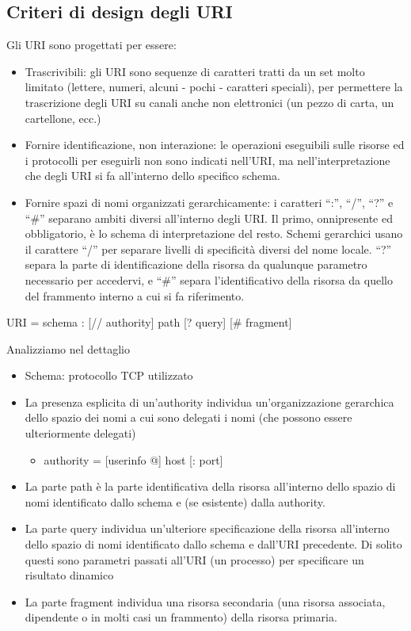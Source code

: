 \documentclass[a4paper,12pt]{article}
\begin{document}
\subsection*{Criteri di design degli URI}
Gli URI sono progettati per essere:
\begin{itemize}
  \item Trascrivibili: gli URI sono sequenze di caratteri tratti da un set molto limitato (lettere, numeri, alcuni - pochi - caratteri speciali), per permettere la trascrizione degli URI su canali anche non elettronici (un pezzo di carta, un cartellone, ecc.)
  \item Fornire identificazione, non interazione: le operazioni eseguibili sulle risorse ed i protocolli per eseguirli non sono indicati nell’URI, ma nell’interpretazione che degli URI si fa all’interno dello specifico schema.
  \item Fornire spazi di nomi organizzati gerarchicamente: i caratteri ``:'', ``/'', ``?'' e ``\#'' separano ambiti diversi all’interno degli URI. Il primo, onnipresente ed obbligatorio, è lo schema di interpretazione del resto. Schemi gerarchici usano il carattere ``/'' per separare livelli di specificità diversi del nome locale. ``?'' separa la parte di identificazione della risorsa da qualunque parametro necessario per accedervi, e ``\#'' separa l’identificativo della risorsa da quello del frammento interno a cui si fa riferimento.
\end{itemize}
\begin{center}
URI = schema : [// authority] path [? query] [\# fragment]
\end{center}
Analizziamo nel dettaglio
\begin{itemize}
  \item Schema: protocollo TCP utilizzato
  \item La presenza esplicita di un’authority individua un’organizzazione gerarchica dello spazio dei nomi a cui sono delegati i nomi (che possono essere ulteriormente delegati)
  \begin{itemize}
    \item authority = [userinfo @] host [: port]
  \end{itemize}
  \item La parte path è la parte identificativa della risorsa all’interno dello spazio di nomi identificato dallo schema e (se esistente) dalla authority.
  \item La parte query individua un’ulteriore specificazione della risorsa all’interno dello spazio di nomi identificato dallo schema e dall’URI precedente. Di solito questi sono parametri passati all’URI (un processo) per specificare un risultato dinamico
  \item La parte fragment individua una risorsa secondaria (una risorsa associata, dipendente o in molti casi un frammento) della risorsa primaria.
\end{itemize}
\end{document}
